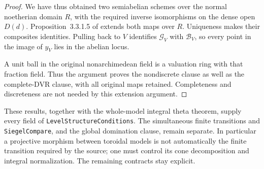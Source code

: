 \begin{proof}
We have thus obtained two semiabelian schemes over the normal
noetherian domain $R$, with the required inverse isomorphisms
on the dense open $D(d)$.  Proposition~3.3.1.5 of
\cite{level-symmetry-lan} extends both maps over $R$.
Uniqueness makes their composites identities.  Pulling back to
$V$ identifies $\mathcal G_V$ with $\mathcal B_V$, so every
point in the image of $y_V$ lies in the abelian locus.

A unit ball in the original nonarchimedean field is a valuation
ring with that fraction field.  Thus the argument proves the
nondiscrete clause as well as the complete-DVR clause, with all
original maps retained.  Completeness and discreteness are not
needed by this extension argument.
\end{proof}

These results, together with the whole-model integral theta
theorem, supply every field of \texttt{LevelStructureConditions}.
The simultaneous finite transitions and \texttt{SiegelCompare},
and the global domination clause, remain separate.
In particular a projective morphism between toroidal models is
not automatically the finite transition required by the source;
one must control its cone decomposition and integral normalization.
The remaining contracts stay explicit\cite{level-symmetry-source}.
